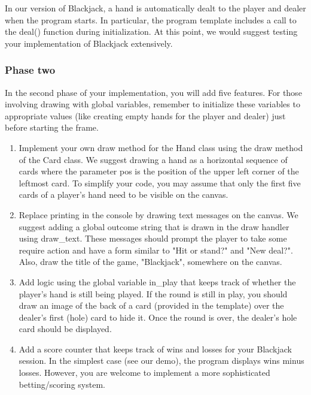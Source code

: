 \documentclass[a4paper,14pt]{article}
\begin{document}
\begin{CJK}{UTF8}{gkai}
\begin{enumerate}
\end{enumerate}


\noindent In our version of Blackjack, a hand is automatically dealt to the player and dealer when the program starts. In particular, the program template includes a call to the deal() function during initialization. At this point, we would suggest testing your implementation of Blackjack extensively.


\subsubsection*{Phase two}

\noindent In the second phase of your implementation, you will add five features. For those involving drawing with global variables, remember to initialize these variables to appropriate values (like creating empty hands for the player and dealer) just before starting the frame.  

\begin{enumerate}


\item \noindent Implement your own draw method for the Hand class using the draw method of the Card class. We suggest drawing a hand as a horizontal sequence of cards where the parameter pos is the position of the upper left corner of the leftmost card. To simplify your code, you may assume that only the first five cards of a player's hand need to be visible on the canvas.

\item Replace printing in the console by drawing text messages on the canvas. We suggest adding a global outcome string that is drawn in the draw handler using draw\_text. These messages should prompt the player to take some require action and have a form similar to "Hit or stand?" and "New deal?". Also, draw the title of the game, "Blackjack", somewhere on the canvas.

\item \noindent Add logic using the global variable in\_play that keeps track of whether the player's hand is still being played. If the round is still in play, you should draw an image of the back of a card (provided in the template) over the dealer's first (hole) card to hide it. Once the round is over, the dealer's hole card should be displayed.

\item Add a score counter that keeps track of wins and losses for your Blackjack session. In the simplest case (see our demo), the program displays wins minus losses. However, you are welcome to implement a more sophisticated betting/scoring system.


\end{enumerate}
\end{CJK}
\end{document}

